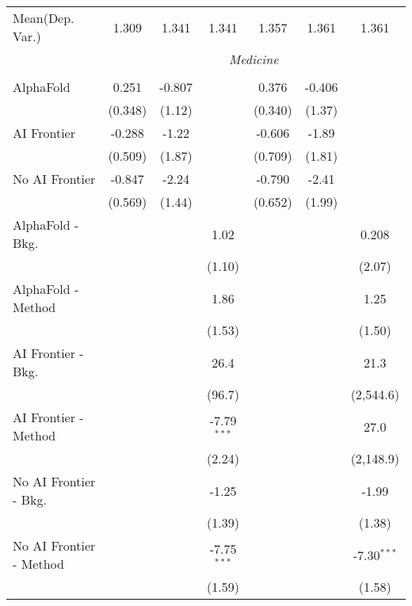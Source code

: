 \begin{tabular}{lcccccc}
Mean(Dep. Var.) & 1.309 & 1.341 & 1.341 & 1.357 & 1.361 & 1.361 \\
 & \multicolumn{6}{c}{\textit{Medicine}} \\ \\
   AlphaFold               & 0.251   & -0.807 &               & 0.376   & -0.406 &   \\   
                           & (0.348) & (1.12) &               & (0.340) & (1.37) &   \\   
   AI Frontier             & -0.288  & -1.22  &               & -0.606  & -1.89  &   \\   
                           & (0.509) & (1.87) &               & (0.709) & (1.81) &   \\   
   No AI Frontier          & -0.847  & -2.24  &               & -0.790  & -2.41  &   \\   
                           & (0.569) & (1.44) &               & (0.652) & (1.99) &   \\   
   AlphaFold - Bkg.        &         &        & 1.02          &         &        & 0.208\\   
                           &         &        & (1.10)        &         &        & (2.07)\\   
   AlphaFold - Method      &         &        & 1.86          &         &        & 1.25\\   
                           &         &        & (1.53)        &         &        & (1.50)\\   
   AI Frontier - Bkg.      &         &        & 26.4          &         &        & 21.3\\   
                           &         &        & (96.7)        &         &        & (2,544.6)\\   
   AI Frontier - Method    &         &        & -7.79$^{***}$ &         &        & 27.0\\   
                           &         &        & (2.24)        &         &        & (2,148.9)\\   
   No AI Frontier - Bkg.   &         &        & -1.25         &         &        & -1.99\\   
                           &         &        & (1.39)        &         &        & (1.38)\\   
   No AI Frontier - Method &         &        & -7.75$^{***}$ &         &        & -7.30$^{***}$\\   
                           &         &        & (1.59)        &         &        & (1.58)\\   

\end{tabular}
